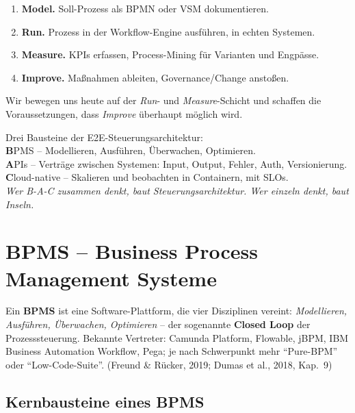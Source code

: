 \documentclass[11pt,a4paper,oneside]{article}
\newcommand{\caveatfontfallback}{\itshape}
\newcommand\caveatfont{\caveatfontfallback}%
\newcommand{\akzent}[1]{{\caveatfont\color{lpAmber}#1}}
\newcommand{\fachbegriff}[1]{\textbf{#1}}
\newcommand{\quelle}[1]{{\footnotesize\color{lpGray}(#1)}}
\begin{document}
\begin{enumerate}
  \item \fachbegriff{Model.} Soll-Prozess als BPMN oder VSM dokumentieren.
  \item \fachbegriff{Run.} Prozess in der Workflow-Engine ausführen, in echten Systemen.
  \item \fachbegriff{Measure.} KPIs erfassen, Process-Mining für Varianten und Engpässe.
  \item \fachbegriff{Improve.} Maßnahmen ableiten, Governance/Change anstoßen.
\end{enumerate}

Wir bewegen uns heute auf der \emph{Run}- und \emph{Measure}-Schicht und schaffen die Voraussetzungen, dass \emph{Improve} überhaupt möglich wird.

\begin{eselsbox}[Eselsbrücke: \akzent{B-A-C}]
Drei Bausteine der E2E-Steuerungsarchitektur:\\[2pt]
\textbf{B}PMS -- Modellieren, Ausführen, Überwachen, Optimieren.\\
\textbf{A}PIs -- Verträge zwischen Systemen: Input, Output, Fehler, Auth, Versionierung.\\
\textbf{C}loud-native -- Skalieren und beobachten in Containern, mit SLOs.\\[2pt]
\emph{Wer B-A-C zusammen denkt, baut Steuerungsarchitektur. Wer einzeln denkt, baut Inseln.}
\end{eselsbox}

\section{BPMS -- Business Process Management Systeme}

Ein \fachbegriff{BPMS} ist eine Software-Plattform, die vier Disziplinen vereint: \emph{Modellieren, Ausführen, Überwachen, Optimieren} -- der sogenannte \fachbegriff{Closed Loop} der Prozesssteuerung. Bekannte Vertreter: Camunda Platform, Flowable, jBPM, IBM Business Automation Workflow, Pega; je nach Schwerpunkt mehr ``Pure-BPM'' oder ``Low-Code-Suite''. \quelle{Freund \& Rücker, 2019; Dumas et al., 2018, Kap.~9}

\subsection{Kernbausteine eines BPMS}
\end{document}
